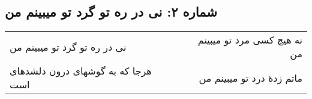 \begin{center}
\section*{شماره ۲: نی در ره تو گرد تو میبینم من}
\label{sec:002}
\begin{longtable}{l p{0.5cm} r}
نی در ره تو گرد تو میبینم من
&&
نه هیچ کسی مرد تو میبینم من
\\
هرجا که به گوشهای درون دلشدهای است
&&
ماتم زدهٔ درد تو میبینم من
\\
\end{longtable}
\end{center}
